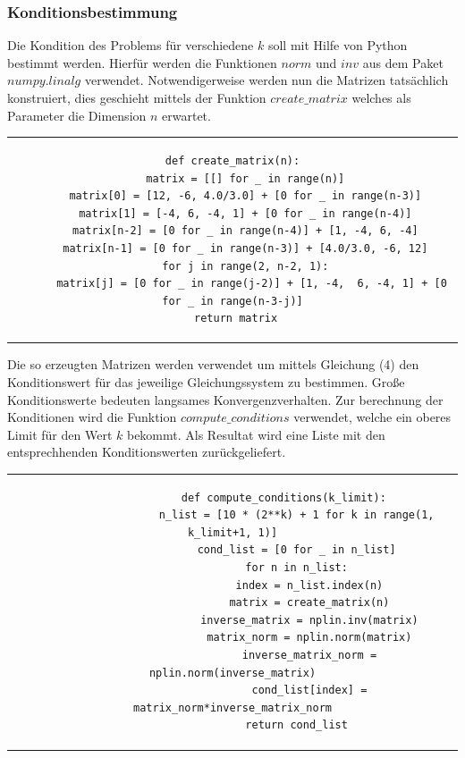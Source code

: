 \documentclass[12pt,titlepage]{article}
\begin{document}
			\subsubsection{Konditionsbestimmung}
				Die Kondition des Problems für verschiedene $k$ soll mit Hilfe von Python bestimmt werden. Hierfür werden die Funktionen $norm$ und $inv$ aus dem Paket $numpy.linalg$ verwendet.
				Notwendigerweise werden nun die Matrizen tatsächlich konstruiert, dies geschieht mittels der Funktion $create\_matrix$ welches als Parameter die Dimension $n$ erwartet.\newline
				\newline
				\begin{tabular}{c}
				\begin{lstlisting}
def create_matrix(n):
   	matrix = [[] for _ in range(n)]
    matrix[0] = [12, -6, 4.0/3.0] + [0 for _ in range(n-3)]
    matrix[1] = [-4, 6, -4, 1] + [0 for _ in range(n-4)]
    matrix[n-2] = [0 for _ in range(n-4)] + [1, -4, 6, -4]
    matrix[n-1] = [0 for _ in range(n-3)] + [4.0/3.0, -6, 12]
    for j in range(2, n-2, 1):
      matrix[j] = [0 for _ in range(j-2)] + [1, -4,  6, -4, 1] + [0 for _ in range(n-3-j)]
    return matrix	
	 			\end{lstlisting}
				\end{tabular}
				\newline \newline
				Die so erzeugten Matrizen werden verwendet um mittels Gleichung (4) den Konditionswert für das jeweilige Gleichungssystem zu bestimmen.
				Große Konditionswerte bedeuten langsames Konvergenzverhalten.
				Zur berechnung der Konditionen wird die Funktion $compute\_conditions$ verwendet, welche ein oberes Limit für den Wert $k$ bekommt.
				Als Resultat wird eine Liste mit den entsprechhenden Konditionswerten zurückgeliefert. \newline \newline
				\begin{tabular}{c}
				\begin{lstlisting}
				def compute_conditions(k_limit):
    				n_list = [10 * (2**k) + 1 for k in range(1, k_limit+1, 1)]
    				cond_list = [0 for _ in n_list]
    				for n in n_list:
        				index = n_list.index(n)
       					matrix = create_matrix(n)
        				inverse_matrix = nplin.inv(matrix)
        				matrix_norm = nplin.norm(matrix)
        				inverse_matrix_norm = nplin.norm(inverse_matrix)
        				cond_list[index] = matrix_norm*inverse_matrix_norm
    				return cond_list
				\end{lstlisting}
				\end{tabular}
\end{document}
